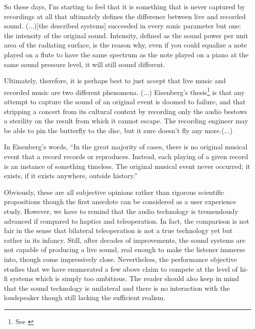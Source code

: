 \begin{displayquote}
So these days, I'm starting to feel that it is something that is never captured by recordings at all that ultimately defines the 
difference between live and recorded sound. (...)[the described systems] succeeded in 
every sonic parameter but one: the intensity of the original sound. Intensity, defined as the sound power per unit area of the 
radiating surface, is the reason why, even if you could equalize a note played on a flute to have the same spectrum as the note 
played on a piano at the same sound pressure level, it will still sound different.

Ultimately, therefore, it is perhaps best to just accept that live music and recorded music are two different phenomena. (...)
Eisenberg's thesis\footnote{See \cite{eisenberg}} is that any attempt to capture the sound of an original event is doomed to 
failure, and that stripping a concert from its cultural context by recording only the audio bestows a sterility on the result 
from which it cannot escape. The recording engineer may be able to pin the butterfly to the disc, but it sure doesn't fly any 
more.(...)

In Eisenberg's words, \enquote{In the great majority of cases, there is no original musical event that a record records or reproduces. 
Instead, each playing of a given record is an instance of something timeless. The original musical event never occurred; it exists, if 
it exists anywhere, outside history.}
\end{displayquote} 



Obviously, these are all subjective opinions rather than rigorous scientific propositions though the first anecdote can be considered as
a user experience study. However, we have to remind that the audio technology is tremendously advanced if compared to haptics and 
teleoperation. In fact, the comparison is not fair in the sense that bilateral teleoperation is not a true technology yet but rather 
in its infancy. Still, after decades of improvements, the sound systems are not capable of producing a live sound, real enough to make 
the listener immerse into, though come impressively close. Nevertheless, the performance objective studies that we have enumerated a 
few above claim to compete at the level of hi-fi systems which is simply too ambitious. The reader should also keep in mind that 
the sound technology is unilateral and there is no interaction with the loudspeaker though still lacking the sufficient realism. 

